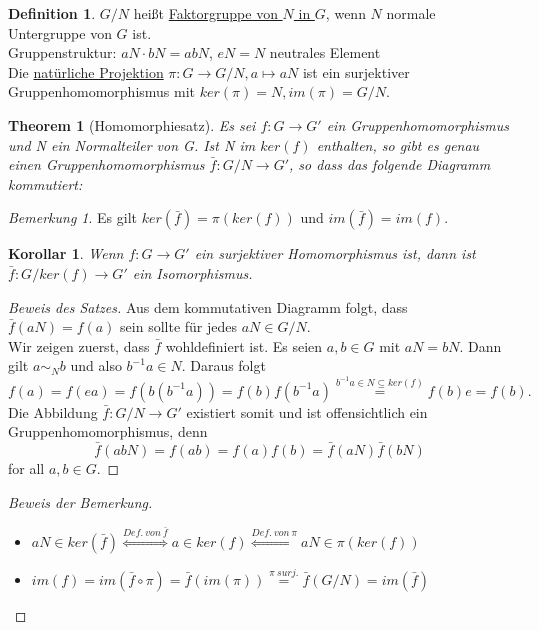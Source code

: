 \documentclass[12pt]{scrartcl}%
\newtheorem{thm}{Theorem}
\newtheorem{kor}{Korollar}
\theoremstyle{definition}
\newtheorem*{defn}{Definition}
\theoremstyle{remark}
\newtheorem*{nb}{Bemerkung}
\begin{document}
\begin{defn}
	$G/N$ heißt \underline{Faktorgruppe von $N$ in $G$}, wenn $N$ normale Untergruppe von $G$ ist. \\
	Gruppenstruktur: $aN \cdot bN = abN$, $eN = N$ neutrales Element \\
	Die \underline{natürliche Projektion} $\pi : G \rightarrow G/N, a \mapsto aN$ ist ein surjektiver Gruppenhomomorphismus mit $ker(\pi) = N, im(\pi) = G/N$.
\end{defn}

\begin{thm}[Homomorphiesatz]
	Es sei $f: G \rightarrow G'$ ein Gruppenhomomorphismus und N ein Normalteiler von G. Ist N im $ker(f)$ enthalten, so gibt es genau einen Gruppenhomomorphismus $\bar{f}: G/N \rightarrow G'$, so dass das folgende Diagramm kommutiert:
	\centering
	\begin{xy}
	\end{xy}
\end{thm}

\begin{nb}
	Es gilt $ker(\bar{f}) = \pi(ker(f))$ und $im(\bar{f}) = im(f)$. 
\end{nb}

\begin{kor}
	Wenn $f: G \rightarrow G'$ ein surjektiver Homomorphismus ist, dann ist $\bar{f}: G/ker(f) \rightarrow G'$ ein Isomorphismus.
\end{kor}

\begin{proof}[Beweis des Satzes]
	Aus dem kommutativen Diagramm folgt, dass $\bar{f}(aN) = f(a)$ sein sollte für jedes $aN \in G/N$. \\
	Wir zeigen zuerst, dass $\bar{f}$ wohldefiniert ist. Es seien $a, b \in G$ mit $aN = bN$. Dann gilt $a \sim_{N} b$ und also $b^{-1}a \in N$. Daraus folgt
	$$f(a) = f(ea) = f(b(b^{-1}a)) = f(b) f(b^{-1}a) \stackrel{b^{-1}a \in N \subseteq ker(f)}{=} f(b)e = f(b).$$
	Die Abbildung $\bar{f}: G/N \rightarrow G'$ existiert somit und ist offensichtlich ein Gruppenhomomorphismus, denn
	$$\bar{f}(abN) = f(ab) = f(a)f(b) = \bar{f}(aN)\bar{f}(bN)$$ for all $a, b \in G$.
\end{proof}

\begin{proof}[Beweis der Bemerkung]
		\begin{itemize}
		\item $aN \in ker(\bar{f}) \stackrel{Def. ~ von ~ \bar{f}}{\Leftrightarrow} a \in ker(f)\stackrel{Def. ~ von ~ \pi}{\Leftrightarrow} aN \in \pi(ker(f))$
		\item $im(f) = im(\bar{f} \circ \pi) = \bar{f}(im(\pi)) \stackrel{\pi ~ surj.}{=} \bar{f}(G/N) = im(\bar{f})$
	\end{itemize}
\end{proof}
\end{document}
